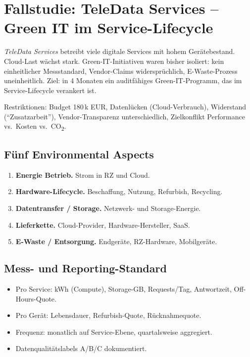 \documentclass[11pt,a4paper,oneside]{article}
\begin{document}
\section{Fallstudie: TeleData Services -- Green IT im Service-Lifecycle}

\emph{TeleData Services} betreibt viele digitale Services mit hohem Gerätebestand. Cloud-Last wächst stark. Green-IT-Initiativen waren bisher isoliert: kein einheitlicher Messstandard, Vendor-Claims widersprüchlich, E-Waste-Prozess uneinheitlich. Ziel: in 4 Monaten ein auditfähiges Green-IT-Programm, das im Service-Lifecycle verankert ist.

Restriktionen: Budget 180\,k EUR, Datenlücken (Cloud-Verbrauch), Widerstand (``Zusatzarbeit''), Vendor-Transparenz unterschiedlich, Zielkonflikt Performance vs.\ Kosten vs.\ CO\textsubscript{2}.

\subsection{Fünf Environmental Aspects}

\begin{enumerate}
  \item \textbf{Energie Betrieb.} Strom in RZ und Cloud.
  \item \textbf{Hardware-Lifecycle.} Beschaffung, Nutzung, Refurbish, Recycling.
  \item \textbf{Datentransfer / Storage.} Netzwerk- und Storage-Energie.
  \item \textbf{Lieferkette.} Cloud-Provider, Hardware-Hersteller, SaaS.
  \item \textbf{E-Waste / Entsorgung.} Endgeräte, RZ-Hardware, Mobilgeräte.
\end{enumerate}

\subsection{Mess- und Reporting-Standard}

\begin{itemize}
  \item Pro Service: kWh (Compute), Storage-GB, Requests/Tag, Antwortzeit, Off-Hours-Quote.
  \item Pro Gerät: Lebensdauer, Refurbish-Quote, Rücknahmequote.
  \item Frequenz: monatlich auf Service-Ebene, quartalsweise aggregiert.
  \item Datenqualitätslabels A/B/C dokumentiert.
\end{itemize}
\end{document}
